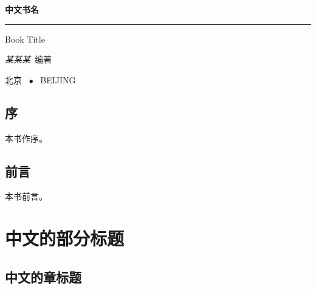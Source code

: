 \documentclass[a4paper,twoside]{ctexbook}
\begin{document}
\begin{titlepage}
  \vspace*{25ex}
  
  \hspace{0.05\textwidth}\begin{minipage}{.9\textwidth}
    \flushright
    
    {\textbf{中文书名}}
    
    \rule[1ex]{\linewidth}{.5pt}
    
    {Book Title} \\
    
    \vspace{20ex}
    
    {\textit{某某某}~编著}
  \end{minipage}
  
  \vfill
  
  \centering
  {北京 ~$\bullet$ ~BEIJING}
\end{titlepage}
\thispagestyle{empty}


\frontmatter


\dominitoc
{}


\chapter*{序}

本书作序。


\chapter*{前言}

本书前言。


{
  \hypersetup{hidelinks}
  \tableofcontents
}




\mainmatter


\part{中文的部分标题}


\chapter{中文的章标题}
\end{document}
